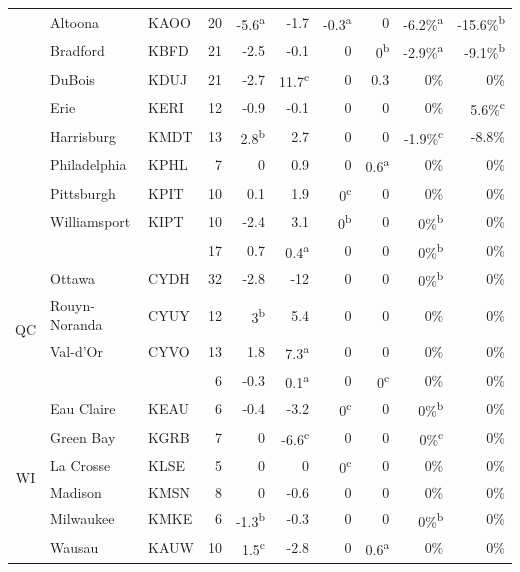 \documentclass[twocol]{ametsoc}
\begin{document}
\begin{landscape}
\begin{table}[]
\begin{tabular}{@{}cllrrrrrrr@{}}
 & Altoona & KAOO & 20 & -5.6\textsuperscript{a} & -1.7 & -0.3\textsuperscript{a} & 0 & -6.2\%\textsuperscript{a} & -15.6\%\textsuperscript{b} \\
 & Bradford & KBFD & 21 & -2.5 & -0.1 & 0 & 0\textsuperscript{b} & -2.9\%\textsuperscript{a} & -9.1\%\textsuperscript{b} \\
 & DuBois & KDUJ & 21 & -2.7 & 11.7\textsuperscript{c} & 0 & 0.3 & 0\% & 0\% \\
 & Erie & KERI & 12 & -0.9 & -0.1 & 0 & 0 & 0\% & 5.6\%\textsuperscript{c} \\
 & Harrisburg & KMDT & 13 & 2.8\textsuperscript{b} & 2.7 & 0 & 0 & -1.9\%\textsuperscript{c} & -8.8\% \\
 & Philadelphia & KPHL & 7 & 0 & 0.9 & 0 & 0.6\textsuperscript{a} & 0\% & 0\% \\
 & Pittsburgh & KPIT & 10 & 0.1 & 1.9 & 0\textsuperscript{c} & 0 & 0\% & 0\% \\
 & Williamsport & KIPT & 10 & -2.4 & 3.1 & 0\textsuperscript{b} & 0 & 0\%\textsuperscript{b} & 0\% \\ \cmidrule(l){2-10} 
 &  &  & 17 & 0.7 & 0.4\textsuperscript{a} & 0 & 0 & 0\%\textsuperscript{b} & 0\% \\ \midrule
\multirow{4}{*}{QC} & Ottawa & CYDH & 32 & -2.8 & -12 & 0 & 0 & 0\%\textsuperscript{b} & 0\% \\
 & Rouyn-Noranda & CYUY & 12 & 3\textsuperscript{b} & 5.4 & 0 & 0 & 0\% & 0\% \\
 & Val-d'Or & CYVO & 13 & 1.8 & 7.3\textsuperscript{a} & 0 & 0 & 0\% & 0\% \\ \cmidrule(l){2-10} 
 &  &  & 6 & -0.3 & 0.1\textsuperscript{a} & 0 & 0\textsuperscript{c} & 0\% & 0\% \\ \midrule
\multirow{7}{*}{WI} & Eau Claire & KEAU & 6 & -0.4 & -3.2 & 0\textsuperscript{c} & 0 & 0\%\textsuperscript{b} & 0\% \\
 & Green Bay & KGRB & 7 & 0 & -6.6\textsuperscript{c} & 0 & 0 & 0\%\textsuperscript{c} & 0\% \\
 & La Crosse & KLSE & 5 & 0 & 0 & 0\textsuperscript{c} & 0 & 0\% & 0\% \\
 & Madison & KMSN & 8 & 0 & -0.6 & 0 & 0 & 0\% & 0\% \\
 & Milwaukee & KMKE & 6 & -1.3\textsuperscript{b} & -0.3 & 0 & 0 & 0\%\textsuperscript{b} & 0\% \\
 & Wausau & KAUW & 10 & 1.5\textsuperscript{c} & -2.8 & 0 & 0.6\textsuperscript{a} & 0\% & 0\% \\ \cmidrule(l){2-10} 

\end{tabular}
\end{table}
\end{landscape}
\end{document}
